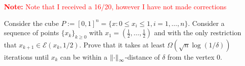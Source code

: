 \documentclass[10pt]{article}
\newcommand{\note}[1]{\textcolor{red}{\textbf{Note:} #1}}
\begin{document}
\maketitle

\note{Note that I received a 16/20, however I have not made corrections}

\begin{problem}[Problem 1]
    Consider the cube \( P:=[0,1]^n = \{x : 0\leq x_i \leq 1, i=1,\ldots, n \} \). Consider a sequence of points \( \{x_k\}_{k\geq 0} \) with \( x_1 = \left( \frac{1}{2}, \ldots, \frac{1}{2} \right) \) and with the only restriction that \( x_{k+1}\in \mathcal{E} (x_k,1/2) \). Prove that it takes at least \( \Omega (\sqrt{n} \log (1/\delta)) \) iterations until \( x_k \) can be within a \( \left\lVert\cdot\right\rVert_\infty \)-distance of \( \delta \) from the vertex \( 0 \).
\end{problem}
\end{document}
